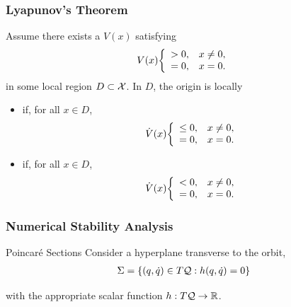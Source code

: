 \begin{frame}
  \frametitle{Lyapunov's Theorem}
  Assume there exists a  $V(x)$ satisfying
  \begin{align*}
    V(x) \bigg\{\begin{array}{l l}
      > 0,& x \ne 0,\\
      = 0,& x = 0.
    \end{array}
  \end{align*}
  in some local region $D \subset \mathcal{X}$. In $D$, the origin is locally
  \begin{itemize}
  \item {} if, for all $x \in D$,
    \begin{align*}
      {\dot V}(x) \bigg\{\begin{array}{l l}
      \leq 0,& x \ne 0,\\
      = 0,& x = 0.
      \end{array}
    \end{align*}
  \item {} if, for all $x \in D$,
    \begin{align*}
      {\dot V}(x) \bigg\{\begin{array}{l l}
      < 0,& x \ne 0,\\
      = 0,& x = 0.
      \end{array}
    \end{align*}
  \end{itemize}
\end{frame}

\begin{frame}
  \frametitle{Numerical Stability Analysis}
  \begin{block}{Poincar\'e Sections}
    Consider a hyperplane transverse to the orbit,
    \begin{align*}
      \Sigma = \left\{ (q, {\dot q}) \in T\mathcal{Q} : h(q, \dot q) = 0\right\}
    \end{align*}
  \end{block}
  with the appropriate scalar function $h : T\mathcal{Q} \to \mathbb{R}$.
\end{frame}
